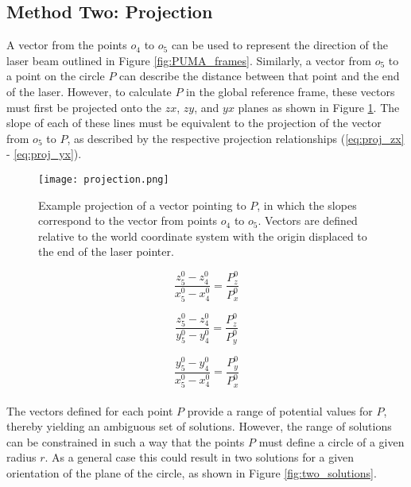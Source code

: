 \documentclass[12pt]{article}
\begin{document}
\subsection{Method Two: Projection}

A vector from the points $o_4$ to $o_5$ can be used to represent the direction of the laser beam outlined in Figure \ref{fig:PUMA_frames}. Similarly, a vector from $o_5$ to a point on the circle $P$ can describe the distance between that point and the end of the laser.  However, to calculate $P$ in the global reference frame, these vectors must first be projected onto the  $zx$, $zy$, and $yx$ planes as shown in Figure \ref{fig:projection}.  The slope of each of these lines must be equivalent to the projection of the vector from $o_5$ to $P$, as described by the respective projection relationships (\ref{eq:proj_zx} - \ref{eq:proj_yx}).

\begin{figure}[!ht]
  {\texttt{[image: projection.png]}}
  \centering
  \caption{Example projection of a vector pointing to $P$, in which the slopes correspond to the vector from points $o_4$ to $o_5$. Vectors are defined relative to the world coordinate system with the origin displaced to the end of the laser pointer.} 
  \centering
  \label{fig:projection}
\end{figure}


\begin{equation}
	\dfrac{z_5^0-z_4^0}{x_5^0-x_4^0} = \dfrac{P_z^0}{P_x^0}
    \label{eq:proj_zx}
\end{equation}

\begin{equation}
	\dfrac{z_5^0-z_4^0}{y_5^0-y_4^0} = \dfrac{P_z^0}{P_y^0}
    \label{eq:proj_zy}
\end{equation}

\begin{equation}
	\dfrac{y_5^0-y_4^0}{x_5^0-x_4^0} = \dfrac{P_y^0}{P_x^0}
    \label{eq:proj_yx}
\end{equation}\\
\noindent
The vectors defined for each point $P$ provide a range of potential values for $P$, thereby yielding an ambiguous set of solutions. However, the range of solutions can be constrained in such a way that the points $P$ must define a circle of a given radius $r$. As a general case this could result in two solutions for a given orientation of the plane of the circle, as shown in Figure \ref{fig:two_solutions}. 
\end{document}
